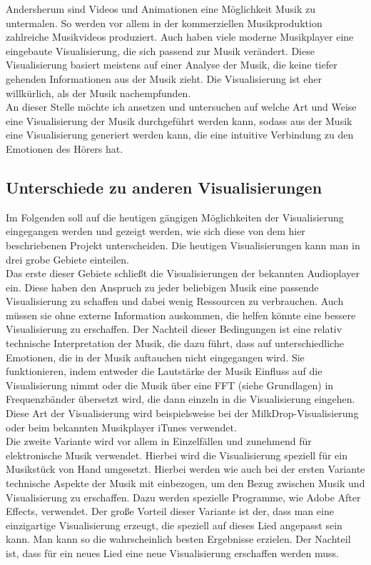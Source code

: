 \documentclass[11pt,a4paper]{article}
\begin{document}
Andersherum sind Videos und Animationen eine Möglichkeit Musik zu untermalen. So werden vor allem in der kommerziellen Musikproduktion zahlreiche Musikvideos produziert. Auch haben viele moderne Musikplayer eine eingebaute Visualisierung, die sich passend zur Musik verändert. Diese Visualisierung basiert meistens auf einer Analyse der Musik, die keine tiefer gehenden Informationen aus der Musik zieht. Die Visualisierung ist eher willkürlich, als der Musik nachempfunden.\\
An dieser Stelle möchte ich ansetzen und untersuchen auf welche Art und Weise eine Visualisierung der Musik durchgeführt werden kann, sodass aus der Musik eine Visualisierung generiert werden kann, die eine intuitive Verbindung zu den Emotionen des Hörers hat.

\subsection{Unterschiede zu anderen Visualisierungen}
Im Folgenden soll auf die heutigen gängigen Möglichkeiten der Visualisierung eingegangen werden und gezeigt werden, wie sich diese von dem hier beschriebenen Projekt unterscheiden. Die heutigen Visualisierungen kann man in drei grobe Gebiete einteilen.\\
Das erste dieser Gebiete schließt die Visualisierungen der bekannten Audioplayer ein. Diese haben den Anspruch zu jeder beliebigen Musik eine passende Visualisierung zu schaffen und dabei wenig Ressourcen zu verbrauchen. Auch müssen sie ohne externe Information auskommen, die helfen könnte eine bessere Visualisierung zu erschaffen. Der Nachteil dieser Bedingungen ist eine relativ technische Interpretation der Musik, die dazu führt, dass auf unterschiedliche Emotionen, die in der Musik auftauchen nicht eingegangen wird. Sie funktionieren, indem entweder die Lautstärke der Musik Einfluss auf die Visualisierung nimmt oder die Musik über eine FFT (siehe Grundlagen) in Frequenzbänder übersetzt wird, die dann einzeln in die Visualisierung eingehen. Diese Art der Visualisierung wird beispielsweise bei der MilkDrop-Visualisierung oder beim bekannten Musikplayer iTunes verwendet.\\
Die zweite Variante wird vor allem in Einzelfällen und zunehmend für elektronische Musik verwendet. Hierbei wird die Visualisierung speziell für ein Musikstück von Hand umgesetzt. Hierbei werden wie auch bei der ersten Variante technische Aspekte der Musik mit einbezogen, um den Bezug zwischen Musik und Visualisierung zu erschaffen. Dazu werden spezielle Programme, wie Adobe After Effects, verwendet. Der große Vorteil dieser Variante ist der, dass man eine einzigartige Visualisierung erzeugt, die speziell auf dieses Lied angepasst sein kann. Man kann so die wahrscheinlich besten Ergebnisse erzielen. Der Nachteil ist, dass für ein neues Lied eine neue Visualisierung erschaffen werden muss.\\
\end{document}
